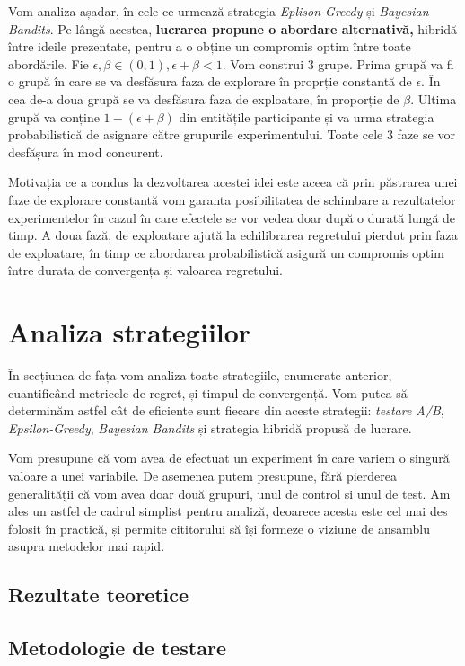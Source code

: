 Vom analiza așadar, în cele ce urmează strategia \textit{Eplison-Greedy} și \textit{Bayesian Bandits}. Pe lângă acestea, \textbf{lucrarea propune o abordare alternativă,} hibridă între ideile prezentate, pentru a o obține un compromis optim între toate abordările. Fie $\epsilon, \beta \in(0, 1), \epsilon + \beta < 1$. Vom construi 3 grupe. Prima grupă va fi o grupă în care se va desfăsura faza de explorare în proprție constantă de $\epsilon$. În cea de-a doua grupă se va desfăsura faza de exploatare, în proporție de $\beta$. Ultima grupă va conține $1 - (\epsilon + \beta)$ din entitățile participante și va urma strategia probabilistică de asignare către grupurile experimentului. Toate cele 3 faze se vor desfășura în mod concurent.

Motivația ce a condus la dezvoltarea acestei idei este aceea că prin păstrarea unei faze de explorare constantă vom garanta posibilitatea de schimbare a rezultatelor experimentelor în cazul în care efectele se vor vedea doar după o durată lungă de timp. A doua fază, de exploatare ajută la echilibrarea regretului pierdut prin faza de exploatare, în timp ce abordarea probabilistică asigură un compromis optim între durata de convergența și valoarea regretului.

\section{Analiza strategiilor}

În secțiunea de fața vom analiza toate strategiile, enumerate anterior, cuantificând metricele de regret, și timpul de convergență. Vom putea să determinăm astfel cât de eficiente sunt fiecare din aceste strategii: \textit{testare A/B}, \textit{Epsilon-Greedy}, \textit{Bayesian Bandits} și strategia hibridă propusă de lucrare. 

Vom presupune că vom avea de efectuat un experiment în care variem o singură valoare a unei variabile. De asemenea putem presupune, fără pierderea generalității că vom avea doar două grupuri, unul de control și unul de test. Am ales un astfel de cadrul simplist pentru analiză, deoarece acesta este cel mai des folosit în practică, și permite cititorului să își formeze o viziune de ansamblu asupra metodelor mai rapid. 

\subsection{Rezultate teoretice}


\subsection{Metodologie de testare}

